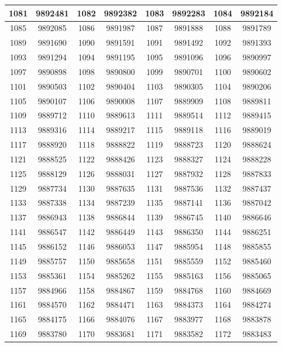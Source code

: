 \documentclass{exam}
\begin{document}
\begin{figure}
\begin{tabular}{|c|c||c|c||c|c||c|c|}
\hline
1081 & 9892481 &1082 & 9892382 &1083 & 9892283 &1084 & 9892184 \\
\hline
1085 & 9892085 &1086 & 9891987 &1087 & 9891888 &1088 & 9891789 \\
\hline
1089 & 9891690 &1090 & 9891591 &1091 & 9891492 &1092 & 9891393 \\
\hline
1093 & 9891294 &1094 & 9891195 &1095 & 9891096 &1096 & 9890997 \\
\hline
1097 & 9890898 &1098 & 9890800 &1099 & 9890701 &1100 & 9890602 \\
\hline
1101 & 9890503 &1102 & 9890404 &1103 & 9890305 &1104 & 9890206 \\
\hline
1105 & 9890107 &1106 & 9890008 &1107 & 9889909 &1108 & 9889811 \\
\hline
1109 & 9889712 &1110 & 9889613 &1111 & 9889514 &1112 & 9889415 \\
\hline
1113 & 9889316 &1114 & 9889217 &1115 & 9889118 &1116 & 9889019 \\
\hline
1117 & 9888920 &1118 & 9888822 &1119 & 9888723 &1120 & 9888624 \\
\hline
1121 & 9888525 &1122 & 9888426 &1123 & 9888327 &1124 & 9888228 \\
\hline
1125 & 9888129 &1126 & 9888031 &1127 & 9887932 &1128 & 9887833 \\
\hline
1129 & 9887734 &1130 & 9887635 &1131 & 9887536 &1132 & 9887437 \\
\hline
1133 & 9887338 &1134 & 9887239 &1135 & 9887141 &1136 & 9887042 \\
\hline
1137 & 9886943 &1138 & 9886844 &1139 & 9886745 &1140 & 9886646 \\
\hline
1141 & 9886547 &1142 & 9886449 &1143 & 9886350 &1144 & 9886251 \\
\hline
1145 & 9886152 &1146 & 9886053 &1147 & 9885954 &1148 & 9885855 \\
\hline
1149 & 9885757 &1150 & 9885658 &1151 & 9885559 &1152 & 9885460 \\
\hline
1153 & 9885361 &1154 & 9885262 &1155 & 9885163 &1156 & 9885065 \\
\hline
1157 & 9884966 &1158 & 9884867 &1159 & 9884768 &1160 & 9884669 \\
\hline
1161 & 9884570 &1162 & 9884471 &1163 & 9884373 &1164 & 9884274 \\
\hline
1165 & 9884175 &1166 & 9884076 &1167 & 9883977 &1168 & 9883878 \\
\hline
1169 & 9883780 &1170 & 9883681 &1171 & 9883582 &1172 & 9883483 \\
\hline

\end{tabular}
\end{figure}
\end{document}
